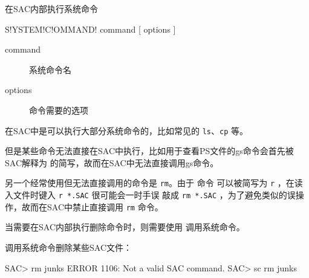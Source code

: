 \label{cmd:systemcommand}

在SAC内部执行系统命令

\begin{SACSTX}
S!YSTEM!C!OMMAND! command [ options ]
\end{SACSTX}

\begin{description}
\item [command] 系统命令名
\item [options] 命令需要的选项
\end{description}

在SAC中是可以执行大部分系统命令的，比如常见的 \texttt{ls}、\texttt{cp} 等。

但是某些命令无法直接在SAC中执行，比如用于查看PS文件的gs命令会首先被SAC解释为
 的简写，故而在SAC中无法直接调用gs命令。

另一个经常使用但无法直接调用的命令是 \texttt{rm}。由于  命令
可以被简写为 \texttt{r} ，在读入文件时键入 \texttt{r *.SAC} 很可能会一时手误
敲成 \texttt{rm *.SAC} ，为了避免类似的误操作，故而在SAC中禁止直接调用 \texttt{rm} 命令。

当需要在SAC内部执行删除命令时，则需要使用  调用系统命令。

调用系统命令删除某些SAC文件：
\begin{SACCode}
SAC> rm junks
 ERROR 1106: Not a valid SAC command.
SAC> sc rm junks
\end{SACCode}